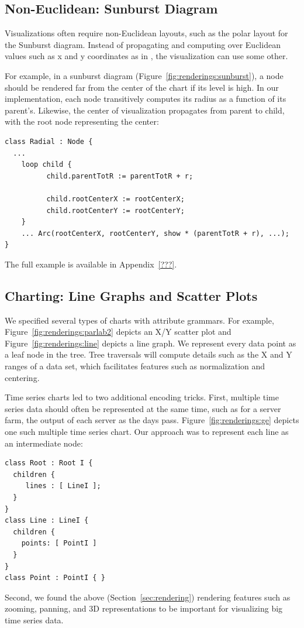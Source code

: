 \subsection{Non-Euclidean: Sunburst Diagram}
Visualizations often require non-Euclidean layouts, such as the polar layout for the Sunburst diagram. Instead of propagating and computing over Euclidean values such as x and y coordinates as in \hlang, the visualization can use some other.

For example, in a sunburst diagram (Figure~\ref{fig:renderings:sunburst}), a node should be rendered  far from the center of the chart if its level is high. In our implementation, each node transitively computes its  radius as a function of its parent's. Likewise, the center of visualization propagates from parent to child, with the root node representing the center:

\begin{lstlisting}
class Radial : Node {
  ...
	loop child {
	      child.parentTotR := parentTotR + r;
	  
	      child.rootCenterX := rootCenterX;
	      child.rootCenterY := rootCenterY;
	}
	... Arc(rootCenterX, rootCenterY, show * (parentTotR + r), ...);
}
\end{lstlisting}
The full example is available in Appendix~\ref{???}.


\subsection{Charting: Line Graphs and Scatter Plots}
We specified several types of charts with attribute grammars. For example, Figure~\ref{fig:renderings:parlab2} depicts an X/Y scatter plot and Figure~\ref{fig:renderings:line} depicts a line graph. We represent every data point as a leaf node in the tree. Tree traversals will compute details such as the X and Y ranges of a data set, which facilitates features such as normalization and centering.

Time series charts led to two additional encoding tricks. First, multiple time series data should often be represented at the same time, such as for a server farm, the output of each server as the days pass. Figure~\ref{fig:renderings:ge} depicts one such multiple time series chart. Our approach was to represent each line as an intermediate node:
\begin{lstlisting}
class Root : Root I {
  children {
     lines : [ LineI ];
  }
}
class Line : LineI {
  children {
    points: [ PointI ]
  }
}
class Point : PointI { }
\end{lstlisting}
Second, we found the above (Section~\ref{sec:rendering}) rendering features such as zooming, panning, and 3D representations to be important for visualizing big time series data.

